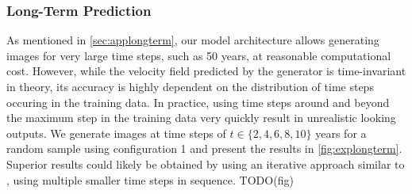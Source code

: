 
\subsubsection*{Long-Term Prediction}
\label{sec:explongterm}
As mentioned in \autoref{sec:applongterm}, our model architecture allows generating images for very large time steps, such as 50 years, at reasonable computational cost. However, while the velocity field predicted by the generator is time-invariant in theory, its accuracy is highly dependent on the distribution of time steps occuring in the training data. In practice, using time steps around and beyond the maximum step in the training data very quickly result in unrealistic looking outputs. We generate images at time steps of $t \in \{2, 4, 6, 8, 10\}$ years for a random sample using configuration 1 and present the results in \autoref{fig:explongterm}.
Superior results could likely be obtained by using an iterative approach similar to \cite{wegmayr2019generative}, using multiple smaller time steps in sequence. TODO(fig)

